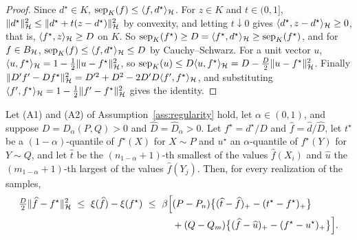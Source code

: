 \begin{proof}
Since $d^\star\in K$, $\mathrm{sep}_K(f)\le\langle f,d^\star\rangle_{\mathcal{H}}$. For $z\in K$ and $t\in(0,1]$,
$\|d^\star\|_{\mathcal{H}}^2\le\|d^\star+t(z-d^\star)\|_{\mathcal{H}}^2$ by convexity, and letting $t\downarrow0$ gives $\langle d^\star,z-d^\star\rangle_{\mathcal{H}}\ge0$, that is, $\langle f^\star,z\rangle_{\mathcal{H}}\ge D$ on $K$. So
$\mathrm{sep}_K(f^\star)\ge D=\langle f^\star,d^\star\rangle_{\mathcal{H}}\ge\mathrm{sep}_K(f^\star)$, and for $f\in B_{\mathcal{H}}$,
$\mathrm{sep}_K(f)\le\langle f,d^\star\rangle_{\mathcal{H}}\le D$ by Cauchy--Schwarz. For a unit vector $u$,
$\langle u,f^\star\rangle_{\mathcal{H}}=1-\tfrac12\|u-f^\star\|_{\mathcal{H}}^2$, so $\mathrm{sep}_K(u)\le D\langle u,f^\star\rangle_{\mathcal{H}}=
D-\tfrac D2\|u-f^\star\|_{\mathcal{H}}^2$. Finally $\|D'f'-Df^\star\|_{\mathcal{H}}^2=D'^2+D^2-2D'D\langle f',f^\star\rangle_{\mathcal{H}}$, and
substituting $\langle f',f^\star\rangle_{\mathcal{H}}=1-\tfrac12\|f'-f^\star\|_{\mathcal{H}}^2$ gives the identity.
\end{proof}

\begin{lemma}
\label{lem:basicineq}
Let (A1) and (A2) of Assumption~\ref{ass:regularity} hold, let $\alpha\in(0,1)$, and suppose $D=D_\alpha(P,Q)>0$ and
$\widehat D=\widehat D_\alpha>0$. Let $f^\star=d^\star/D$ and $\widehat f=\widehat d/\widehat D$, let $t^\star$ be a
$(1-\alpha)$-quantile of $f^\star(X)$ for $X\sim P$ and $u^\star$ an $\alpha$-quantile of $f^\star(Y)$ for $Y\sim Q$,
and let $\widehat t$ be the $(n_{1-\alpha}+1)$-th smallest of the values $\widehat f(X_i)$ and $\widehat u$ the
$(m_{1-\alpha}+1)$-th largest of the values $\widehat f(Y_j)$. Then, for every realization of the samples,
\[
\begin{aligned}
\tfrac D2\|\widehat f-f^\star\|_{\mathcal{H}}^2\ \le\ \xi(\widehat f)-\xi(f^\star)
\ \le\ \beta\Big[&(P-P_n)\big\{(\widehat t-\widehat f)_+-(t^\star-f^\star)_+\big\}\\
&+(Q-Q_m)\big\{(\widehat f-\widehat u)_+-(f^\star-u^\star)_+\big\}\Big].
\end{aligned}
\]
\end{lemma}

